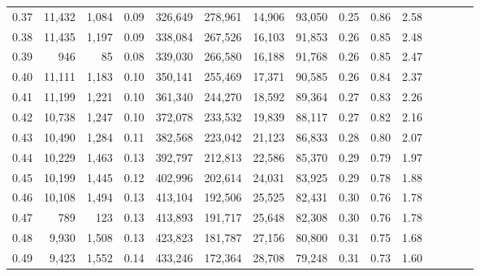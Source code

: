 \begin{tabular}{rrrcrrrrrrrrrrr}
0.37 &  11,432 &  1,084 &                                       0.09 &  326,649 &  278,961 &   14,906 &   93,050 &  0.25 &  0.86 &                         2.58 \\
0.38 &  11,435 &  1,197 &                                       0.09 &  338,084 &  267,526 &   16,103 &   91,853 &  0.26 &  0.85 &                         2.48 \\
0.39 &     946 &     85 &                                       0.08 &  339,030 &  266,580 &   16,188 &   91,768 &  0.26 &  0.85 &                         2.47 \\
0.40 &  11,111 &  1,183 &                                       0.10 &  350,141 &  255,469 &   17,371 &   90,585 &  0.26 &  0.84 &                         2.37 \\
0.41 &  11,199 &  1,221 &                                       0.10 &  361,340 &  244,270 &   18,592 &   89,364 &  0.27 &  0.83 &                         2.26 \\
0.42 &  10,738 &  1,247 &                                       0.10 &  372,078 &  233,532 &   19,839 &   88,117 &  0.27 &  0.82 &                         2.16 \\
0.43 &  10,490 &  1,284 &                                       0.11 &  382,568 &  223,042 &   21,123 &   86,833 &  0.28 &  0.80 &                         2.07 \\
0.44 &  10,229 &  1,463 &                                       0.13 &  392,797 &  212,813 &   22,586 &   85,370 &  0.29 &  0.79 &                         1.97 \\
0.45 &  10,199 &  1,445 &                                       0.12 &  402,996 &  202,614 &   24,031 &   83,925 &  0.29 &  0.78 &                         1.88 \\
0.46 &  10,108 &  1,494 &                                       0.13 &  413,104 &  192,506 &   25,525 &   82,431 &  0.30 &  0.76 &                         1.78 \\
0.47 &     789 &    123 &                                       0.13 &  413,893 &  191,717 &   25,648 &   82,308 &  0.30 &  0.76 &                         1.78 \\
0.48 &   9,930 &  1,508 &                                       0.13 &  423,823 &  181,787 &   27,156 &   80,800 &  0.31 &  0.75 &                         1.68 \\
0.49 &   9,423 &  1,552 &                                       0.14 &  433,246 &  172,364 &   28,708 &   79,248 &  0.31 &  0.73 &                         1.60 \\

\end{tabular}
